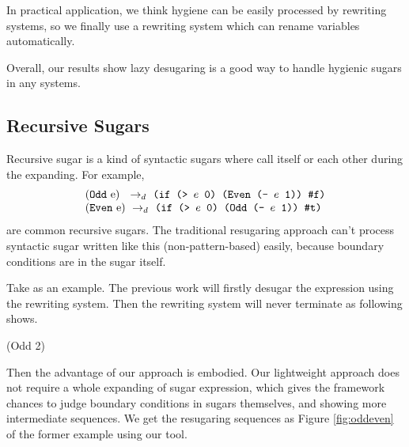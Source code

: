 In practical application, we think hygiene can be easily processed by rewriting systems, so we finally use a rewriting system which can rename variables automatically.

Overall, our results show lazy desugaring is a good way to handle hygienic sugars in any systems.

\subsection{Recursive Sugars}
\label{sec:recursiveSugar}

Recursive sugar is a kind of syntactic sugars where call itself or each other during the expanding. For example,
\[
\begin{array}{l}
\drule{(\m{Odd}~$e$)~}{\Code{(if (> $e$ 0) (Even (- $e$ 1)) \false)}}\\
\drule{(\m{Even}~$e$)}{\Code{(if (> $e$ 0) (Odd (- $e$ 1)) \true)}}
\end{array}
\]
are common recursive sugars. The traditional resugaring approach can't process syntactic sugar written like this (non-pattern-based) easily, because boundary conditions are in the sugar itself.

Take  as an example. The previous work will firstly desugar the expression using the rewriting system. Then the rewriting system will never terminate as following shows.
\begin{scriptsize}
\begin{Codes}
   (Odd 2)
\end{Codes}
\end{scriptsize}



Then the advantage of our approach is embodied. Our lightweight approach does not require a whole expanding of sugar expression, which gives the framework chances to judge boundary conditions in sugars themselves, and showing more intermediate sequences. We get the resugaring sequences as Figure \ref{fig:oddeven} of the former example using our tool.



